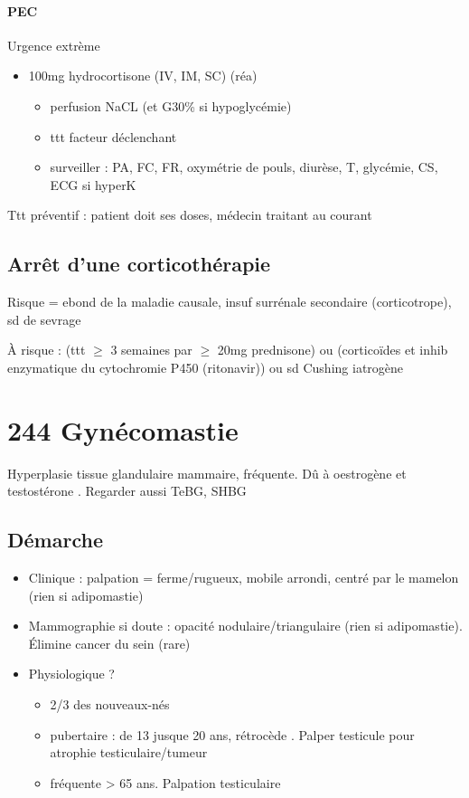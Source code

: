 \documentclass{book}
\begin{document}
\paragraph{PEC}
\label{sec:org006888f}
\danger Urgence extrème \faBomb
\begin{itemize}
\item 100mg hydrocortisone (IV, IM, SC) \thus \faHospitalO (réa)
\begin{itemize}
\item perfusion NaCL (et G30\% si hypoglycémie)
\item ttt facteur déclenchant
\item surveiller : PA, FC, FR, oxymétrie de pouls, diurèse, T, glycémie, CS, ECG
si hyperK
\end{itemize}
\end{itemize}

Ttt préventif : patient doit \inc ses doses, médecin traitant au courant

\subsection{Arrêt d'une corticothérapie}
\label{sec:org2291001}
Risque = ebond de la maladie causale, insuf surrénale secondaire (corticotrope), sd de sevrage

À risque : (ttt \(\ge\) 3 semaines par \(\ge\) 20mg prednisone) ou (corticoïdes et inhib enzymatique du
cytochromie P450 (ritonavir)) ou sd Cushing iatrogène
\section{244 \textdagger{} Gynécomastie}
\label{sec:org99c70cf}
Hyperplasie tissue glandulaire mammaire, fréquente. Dû à oestrogène \inc{} et testostérone \dec{}. Regarder aussi TeBG,
SHBG
\subsection{Démarche}
\label{sec:org926c6eb}
\begin{itemize}
\item Clinique : palpation = ferme/rugueux, mobile arrondi, centré par le mamelon (rien si adipomastie)
\item Mammographie si doute : opacité nodulaire/triangulaire (rien si adipomastie). Élimine cancer du sein (rare)
\item Physiologique ? 
\begin{itemize}
\item 2/3 des nouveaux-nés
\item pubertaire : de 13 jusque 20 ans, rétrocède . Palper testicule pour atrophie testiculaire/tumeur
\item fréquente > 65 ans. Palpation testiculaire
\end{itemize}
\end{itemize}
\end{document}
